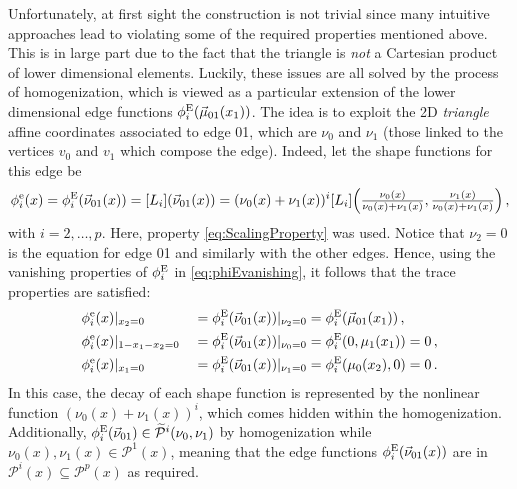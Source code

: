 Unfortunately, at first sight the construction is not trivial since many intuitive approaches lead to violating some of the required properties mentioned above.
This is in large part due to the fact that the triangle is \textit{not} a Cartesian product of lower dimensional elements.
Luckily, these issues are all solved by the process of homogenization, which is viewed as a particular extension of the lower dimensional edge functions $\phi_i^{\mathrm{E}}(\vec{\mu}_{01}(x_1))$.
The idea is to exploit the 2D \textit{triangle} affine coordinates associated to edge 01, which are $\nu_0$ and $\nu_1$ (those linked to the vertices $v_0$ and $v_1$ which compose the edge).
Indeed, let the shape functions for this edge be
\begin{equation*}
    \phi_i^\mathrm{e}(x)=\phi_i^{\mathrm{E}}(\vec{\nu}_{01}(x))=[L_i](\vec{\nu}_{01}(x))
    	=(\nu_0(x)+\nu_1(x))^i
    		[L_i]\Big(\textstyle{\frac{\nu_0(x)}{\nu_0(x)+\nu_1(x)}},\textstyle{\frac{\nu_1(x)}{\nu_0(x)+\nu_1(x)}}\Big)\,,
\end{equation*}
with $i=2,\ldots,p$.
Here, property \eqref{eq:ScalingProperty} was used.
Notice that $\nu_2=0$ is the equation for edge 01 and similarly with the other edges.
Hence, using the vanishing properties of $\phi_i^{\mathrm{E}}$ in \eqref{eq:phiEvanishing}, it follows that the trace properties are satisfied:
\begin{alignat*}{3}
    &\phi_i^\mathrm{e}(x)|_{x_2=0}&&=\phi_i^{\mathrm{E}}(\vec{\nu}_{01}(x))|_{\nu_2=0}=\phi_i^{\mathrm{E}}(\vec{\mu}_{01}(x_1))\,,\\
    &\phi_i^\mathrm{e}(x)|_{1-x_1-x_2=0}&&=\phi_i^{\mathrm{E}}(\vec{\nu}_{01}(x))|_{\nu_0=0}=\phi_i^{\mathrm{E}}(0,\mu_1(x_1))=0\,,\\
  	&\phi_i^\mathrm{e}(x)|_{x_1=0}&&=\phi_i^{\mathrm{E}}(\vec{\nu}_{01}(x))|_{\nu_1=0}=\phi_i^{\mathrm{E}}(\mu_0(x_2),0)=0\,.
\end{alignat*}
In this case, the decay of each shape function is represented by the nonlinear function $(\nu_0(x)+\nu_1(x))^i$, which comes hidden within the homogenization.
Additionally, $\phi_i^{\mathrm{E}}(\vec{\nu}_{01})\in\widetilde{\mathcal{P}}^i(\nu_0,\nu_1)$ by homogenization while $\nu_0(x),\nu_1(x)\in\mathcal{P}^1(x)$, meaning that the edge functions $\phi_i^{\mathrm{E}}(\vec{\nu}_{01}(x))$ are in $\mathcal{P}^i(x)\subseteq\mathcal{P}^p(x)$ as required.
%
